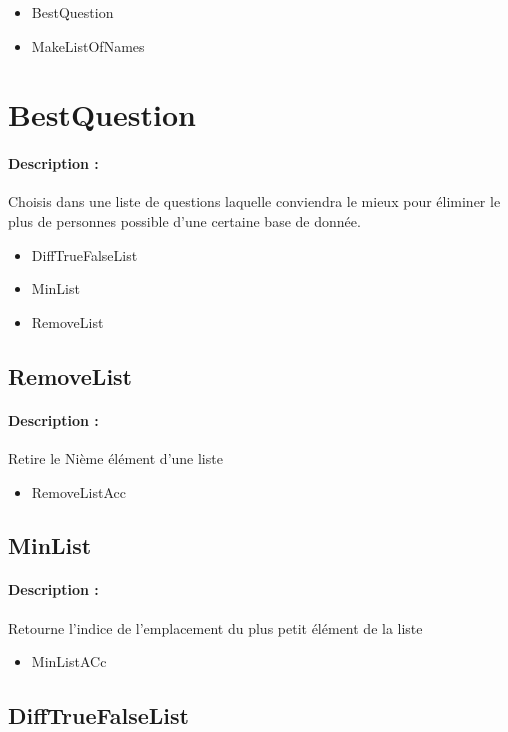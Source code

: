 \documentclass[10pt,a4paper]{article}
\begin{document}
\begin{itemize}
\item BestQuestion
\item MakeListOfNames
\end{itemize}

\section{BestQuestion}
\paragraph{Description :} Choisis dans une liste de questions laquelle conviendra le mieux pour éliminer le plus de personnes possible d'une certaine base de donnée.

\begin{itemize}
\item DiffTrueFalseList
\item MinList
\item RemoveList
\end{itemize}

\subsection{RemoveList}
\paragraph{Description :} Retire le Nième élément d'une liste

\begin{itemize}
\item RemoveListAcc
\end{itemize}

\subsection{MinList}
\paragraph{Description :} Retourne l'indice de l'emplacement du plus petit élément de la liste

\begin{itemize}
\item MinListACc
\end{itemize}

\subsection{DiffTrueFalseList}
\end{document}
